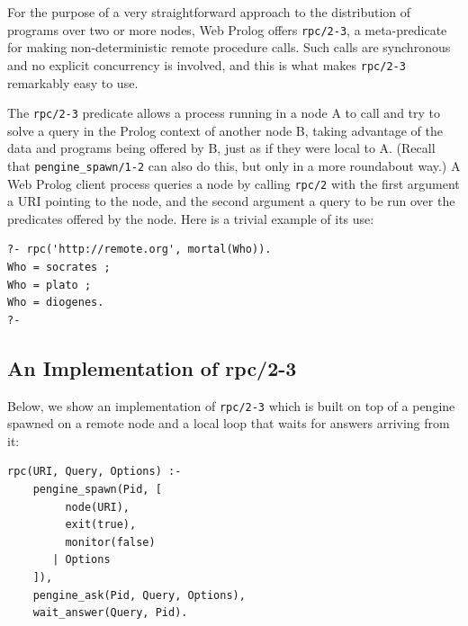 \documentclass{tlp}
\begin{document}
For the purpose of a very straightforward approach to the distribution of programs over two or more nodes, Web Prolog offers \texttt{rpc/2-3}, a meta-predicate for making non-deterministic remote procedure calls. Such calls are synchronous and no explicit concurrency is involved, and this is what makes \texttt{rpc/2-3} remarkably easy to use.

The \texttt{rpc/2-3} predicate allows a process running in a node A to call and try to solve a query in the Prolog context of another node B, taking advantage of the data and programs being offered by B, just as if they were local to A. (Recall that \texttt{pengine\_spawn/1-2} can also do this, but only in a more roundabout way.) A Web Prolog client process queries a node by calling \texttt{rpc/2} with the first argument a URI pointing to the node, and the second argument a query to be run over the predicates offered by the node. Here is a trivial example of its use:

\begin{lstlisting}
?- rpc('http://remote.org', mortal(Who)).
Who = socrates ;
Who = plato ;
Who = diogenes.
?-
\end{lstlisting}


\subsection{An Implementation of rpc/2-3}\label{sec:rpc-implementation}

Below, we show an implementation of \texttt{rpc/2-3} which is built on top of a pengine spawned on a remote node and a local loop that waits for answers arriving from it:


\begin{lstlisting}
rpc(URI, Query, Options) :-
    pengine_spawn(Pid, [
         node(URI),
         exit(true),
         monitor(false)
       | Options
    ]),
    pengine_ask(Pid, Query, Options),
    wait_answer(Query, Pid).
\end{lstlisting}
\end{document}

